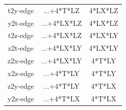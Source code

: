 \begin{table}[t]
\begin{tabular*}{1.\textwidth}{@{\extracolsep{\fill}}ccc}
    t2y-edge     & ...+4*T*LZ          & 4*LX*LZ \\
    y2t-edge     & ...+4*LX*LZ         & 4*LX*LZ \\
    t2z-edge     & ...+4*LX*LZ         & 4*LX*LY \\
    z2t-edge     & ...+4*LX*LY         & 4*LX*LY \\
    z2x-edge     & ...+4*LX*LY         & 4*T*LY \\
    x2z-edge     & ...+4*T*LY          & 4*T*LY \\
    z2y-edge     & ...+4*T*LY          & 4*T*LX \\
    y2z-edge     & ...+4*T*LX          & 4*T*LX \\
    \hline\hline
 \end{tabular*}
\end{table}

